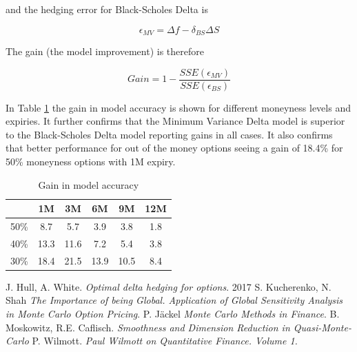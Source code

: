 \documentclass{article}
\begin{document}
and the hedging error for Black-Scholes Delta is

\[
\epsilon_{MV} = \Delta f - \delta_{BS} \Delta S
\]

The gain (the model improvement) is therefore 

\[
Gain = 1 - \frac{SSE(\epsilon_{MV})}{SSE(\epsilon_{BS})}
\]

In Table \ref{tab:gain} the gain in model accuracy is shown for different moneyness levels and expiries. It further confirms that the Minimum Variance Delta model
is superior to the Black-Scholes Delta model reporting gains in all cases. It also confirms that better performance for out of the money options seeing a gain of
18.4\% for 50\% moneyness options with 1M expiry.

\begin{table}[ht]
    \centering
    \caption{Gain in model accuracy}
    \label{tab:gain}
    \begin{tabular}{|c|c|c|c|c|c|}
        \hline
         &1M & 3M & 6M & 9M & 12M \\
        \hline
        50\% &  8.7 &  5.7 &  3.9 &  3.8 & 1.8 \\
        40\% & 13.3 & 11.6 &  7.2 &  5.4 & 3.8 \\
        30\% & 18.4 & 21.5 & 13.9 & 10.5 & 8.4 \\
        \hline
    \end{tabular}
\end{table}


\begin{thebibliography}{9}
J. Hull, A. White. \textit{Optimal delta hedging for options}. 2017
S. Kucherenko, N. Shah \textit{The Importance of being Global. Application of Global Sensitivity Analysis in Monte Carlo Option Pricing}.
P. J{\"a}ckel \textit{Monte Carlo Methods in Finance}.
B. Moskowitz, R.E. Caflisch. \textit{Smoothness and Dimension Reduction in Quasi-Monte-Carlo}
P. Wilmott. \textit{Paul Wilmott on Quantitative Finance. Volume 1.}
\end{thebibliography}
\end{document}

